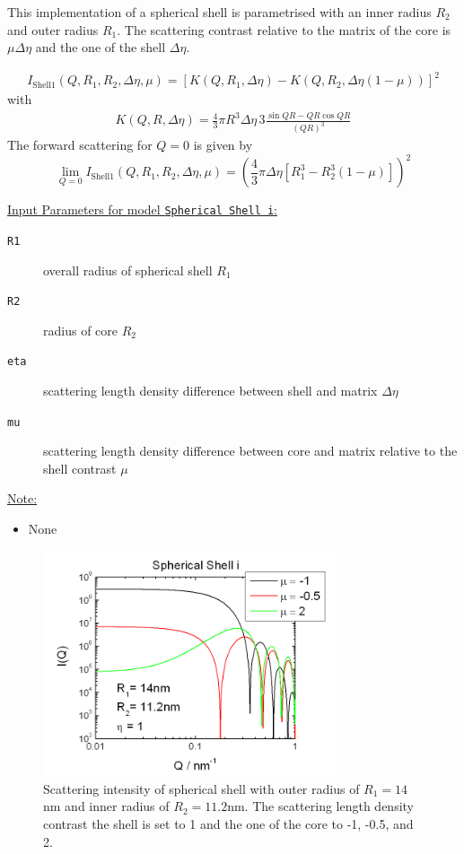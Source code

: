 This implementation of a spherical shell is parametrised with an inner radius $ R_2$ and outer
radius $R_1$. The scattering contrast relative to the matrix of the core is $\mu \Delta \eta$
and the one of the shell $\Delta\eta$.

\begin{align}
I_\text{Shell1}(Q,R_1,R_2,\Delta\eta,\mu)=
\left[K(Q,R_1,\Delta\eta)-K(Q,R_2,\Delta\eta(1-\mu))\right]^2
\end{align}
with
\begin{align}
 K(Q,R,\Delta\eta) = \frac{4}{3}\pi R^3 \Delta\eta \, 3 \frac{\sin QR - QR \cos QR}{(QR)^3}
\end{align}
The forward scattering for $Q=0$ is given by
$$
\lim_{Q=0}I_\text{Shell1}(Q,R_1,R_2,\Delta\eta,\mu) =
\left(\frac{4}{3}\pi \Delta\eta \left[ R_1^3 -
R_2^3(1-\mu)\right]\right)^2
$$

\vspace{5mm}
\noindent  \uline{Input Parameters for model \texttt{Spherical Shell i}:}
\begin{description}
\item[\texttt{R1}] overall radius of spherical shell $R_1$
\item[\texttt{R2}] radius of core $R_2$
\item[\texttt{eta}] scattering length density difference between shell and matrix $\Delta\eta$
\item[\texttt{mu}] scattering length density difference between core and matrix relative to the shell contrast $\mu$
\end{description}

\noindent\uline{Note:}
\begin{itemize}
\item[~] None
\end{itemize}

\begin{figure}[htb]
\begin{center}
\includegraphics[width=0.768\textwidth]{../images/form_factor/spheres/shell_i_P.png}
\end{center}
\caption{Scattering intensity of spherical shell with outer radius of $R_1=14$nm
and inner radius of $R_2=11.2$nm. The scattering length density contrast the shell is set to 1
and the one of the core to -1, -0.5, and 2.} \label{fig:I_shell_i}
\end{figure}



